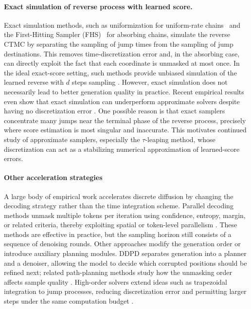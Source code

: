 \documentclass{article}
\begin{document}
\paragraph{Exact simulation of reverse process with learned score.}
Exact simulation methods, such as uniformization for uniform-rate chains~\citep{chen2024convergence} and the First-Hitting Sampler (FHS)~\citep{liang2026sharp,zheng2024masked} for absorbing chains, simulate the reverse CTMC by separating the sampling of jump times from the sampling of jump destinations. 
This removes time-discretization error and, in the absorbing case, can directly exploit the fact that each coordinate is unmasked at most once. 
In the ideal exact-score setting, such methods provide unbiased simulation of the learned reverse  with $d$ steps sampling \citep{liang2026sharp}. 
However, exact simulation does not necessarily lead to better generation quality in practice. Recent empirical results even show that exact simulation can underperform approximate solvers despite having no discretization error \citep{ren2025fast}. One possible reason is that exact samplers concentrate many jumps near the terminal phase of the reverse process, precisely where score estimation is most singular and inaccurate. 
%
This motivates continued study of approximate samplers, especially the $\tau$-leaping method, whose discretization can act as a stabilizing numerical approximation of learned-score errors.

\paragraph{Other acceleration strategies}
A large body of empirical work accelerates discrete diffusion by changing the decoding strategy rather than the time integration scheme. 
Parallel decoding methods unmask multiple tokens per iteration using confidence, entropy, margin, or related criteria, thereby exploiting spatial or token-level parallelism \citep{chang2022maskgit, ringel2026dependency, xie2025variational, wu2025fast, yu2025dimple}. 
These methods are effective in practice, but the sampling horizon still consists of a sequence of denoising rounds. 
Other approaches modify the generation order or introduce auxiliary planning modules. 
DDPD \citep{liu2024think} separates generation into a planner and a denoiser, allowing the model to decide which corrupted positions should be refined next; related path-planning methods study how the unmasking order affects sample quality \citep{peng2025path}. High-order solvers \citep{ren2025fast} extend ideas such as trapezoidal integration to jump processes, reducing discretization error and permitting larger steps under the same computation budget . 
\end{document}
